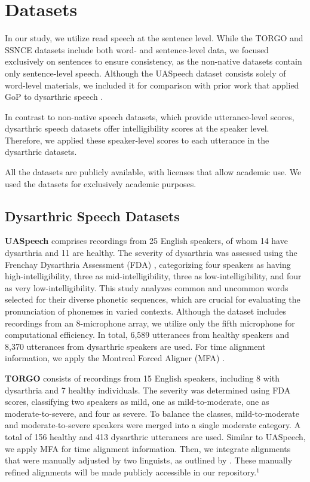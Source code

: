 \section{Datasets}\label{subsec:dataset-details}
In our study, we utilize read speech at the sentence level. 
While the TORGO and SSNCE datasets include both word- and sentence-level data, we focused exclusively on sentences to ensure consistency, as the non-native datasets contain only sentence-level speech. 
Although the UASpeech dataset consists solely of word-level materials, we included it for comparison with prior work that applied GoP to dysarthric speech \citep{yeo23_interspeech}.

In contrast to non-native speech datasets, which provide utterance-level scores, dysarthric speech datasets offer intelligibility scores at the speaker level.
Therefore, we applied these speaker-level scores to each utterance in the dysarthric datasets.


All the datasets are publicly available, with licenses that allow academic use.
We used the datasets for exclusively academic purposes.


\subsection{Dysarthric Speech Datasets}\label{subsubsec:dysarthric}
\textbf{UASpeech} \citep{kim2008dysarthric} comprises recordings from 25 English speakers, of whom 14 have dysarthria and 11 are healthy. The severity of dysarthria was assessed using the Frenchay Dysarthria Assessment (FDA) \citep{enderby1980frenchay}, categorizing four speakers as having high-intelligibility, three as mid-intelligibility, three as low-intelligibility, and four as very low-intelligibility. This study analyzes common and uncommon words selected for their diverse phonetic sequences, which are crucial for evaluating the pronunciation of phonemes in varied contexts. Although the dataset includes recordings from an 8-microphone array, we utilize only the fifth microphone for computational efficiency. In total, 6,589 utterances from healthy speakers and 8,370 utterances from dysarthric speakers are used. 
For time alignment information, we apply the Montreal Forced Aligner (MFA) \citep{mcauliffe2017montreal}.


\textbf{TORGO} \citep{rudzicz2012torgo} consists of recordings from 15 English speakers, including 8 with dysarthria and 7 healthy individuals. The severity was determined using FDA scores, classifying two speakers as mild, one as mild-to-moderate, one as moderate-to-severe, and four as severe. To balance the classes, mild-to-moderate and moderate-to-severe speakers were merged into a single moderate category. A total of 156 healthy and 413 dysarthric utterances are used.
Similar to UASpeech, we apply MFA for time alignment information. 
Then, we integrate alignments that were manually adjusted by two linguists, as outlined by \citet{hernandez2020dysarthria}. 
These manually refined alignments will be made publicly accessible in our repository.$^1$


